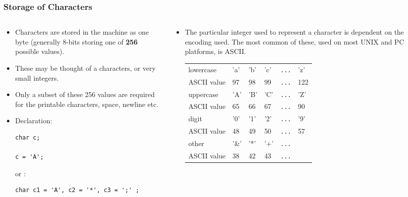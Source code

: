 
\begin{frame}[fragile]
\frametitle{Storage of Characters}
\begin{columns}

\begin{column}{0.45\textwidth}
\begin{itemize}[<+->]
\item Characters are stored in the machine as one byte (generally $8$-bits storing one
of {\bf 256} possible values).
\item These may be thought of a characters, or very small integers.
\item Only a subset of these 256 values are required
for the printable characters, space, newline etc.
\item Declaration:
\begin{verbatim}
char c;

c = 'A';
\end{verbatim}
or :
\begin{verbatim}
char c1 = 'A', c2 = '*', c3 = ';' ;
\end{verbatim}
\end{itemize}
\end{column}

\pause
\begin{column}{0.45\textwidth}
\begin{itemize}[<+->]
\item The particular integer used to represent a character
is dependent on the encoding used. The most common
of these, used on most UNIX and PC platforms, is ASCII.

\begin{center}
\begin{tabular}{|l|lllll|}\hline
lowercase   & 'a' & 'b' & 'c' & \verb^...^ & 'z' \\
ASCII value & 97  &  98 &  99 & \verb^...^ & 122 \\ \hline
uppercase   & 'A' & 'B' & 'C' & \verb^...^ & 'Z' \\
ASCII value & 65  &  66 &  67 & \verb^...^ &  90 \\ \hline
digit       & '0' & '1' & '2' & \verb^...^ & '9' \\
ASCII value & 48  &  49 &  50 & \verb^...^ &  57 \\ \hline
other       & '\&' & '*' & '+' & \verb^...^ & \\
ASCII value & 38  &  42 &  43 & \verb^...^ & \\ \hline
\end{tabular}
\end{center}

\pause
{}

\end{itemize}
\end{column}

\end{columns}
\end{frame}


